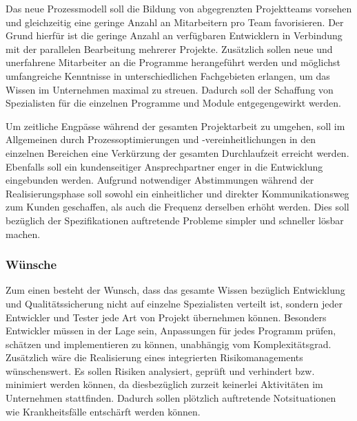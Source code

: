 Das neue Prozessmodell soll die Bildung von abgegrenzten Projektteams vorsehen und gleichzeitig eine geringe Anzahl an Mitarbeitern pro Team favorisieren. Der Grund hierfür ist die geringe Anzahl an verfügbaren Entwicklern in Verbindung mit der parallelen Bearbeitung mehrerer Projekte. Zusätzlich sollen neue und unerfahrene Mitarbeiter an die Programme herangeführt werden und möglichst umfangreiche Kenntnisse in unterschiedlichen Fachgebieten erlangen, um das Wissen im Unternehmen maximal zu streuen. Dadurch soll der Schaffung von Spezialisten für die einzelnen Programme und Module entgegengewirkt werden.

Um zeitliche Engpässe während der gesamten Projektarbeit zu umgehen, soll im Allgemeinen durch Prozessoptimierungen und -vereinheitlichungen in den einzelnen Bereichen eine Verkürzung der gesamten Durchlaufzeit erreicht werden. Ebenfalls soll ein kundenseitiger Ansprechpartner enger in die Entwicklung eingebunden werden. Aufgrund notwendiger Abstimmungen während der Realisierungsphase soll sowohl ein einheitlicher und direkter Kommunikationsweg zum Kunden geschaffen, als auch die Frequenz derselben erhöht werden. Dies soll bezüglich der Spezifikationen auftretende Probleme simpler und schneller lösbar machen.

\subsubsection{Wünsche}
Zum einen besteht der Wunsch, dass das gesamte Wissen bezüglich Entwicklung und Qualitätssicherung nicht auf einzelne Spezialisten verteilt ist, sondern jeder Entwickler und Tester jede Art von Projekt übernehmen können. Besonders Entwickler müssen in der Lage sein, Anpassungen für jedes Programm prüfen, schätzen und implementieren zu können, unabhängig vom Komplexitätsgrad. Zusätzlich wäre die Realisierung eines integrierten Risikomanagements wünschenswert. Es sollen Risiken analysiert, geprüft und verhindert bzw. minimiert werden können, da diesbezüglich zurzeit keinerlei Aktivitäten im Unternehmen stattfinden. Dadurch sollen plötzlich auftretende Notsituationen wie Krankheitsfälle entschärft werden können.